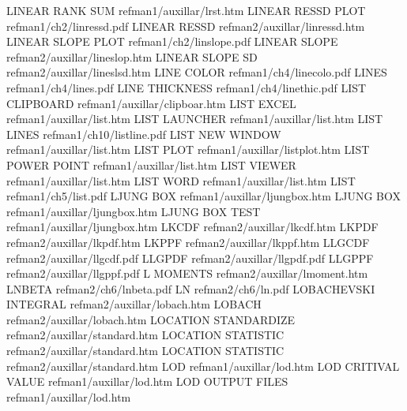 LINEAR RANK SUM                         refman1/auxillar/lrst.htm
LINEAR RESSD PLOT                       refman1/ch2/linressd.pdf
LINEAR RESSD                            refman2/auxillar/linressd.htm
LINEAR SLOPE PLOT                       refman1/ch2/linslope.pdf
LINEAR SLOPE                            refman2/auxillar/lineslop.htm
LINEAR SLOPE SD                         refman2/auxillar/lineslsd.htm
LINE COLOR                              refman1/ch4/linecolo.pdf
LINES                                   refman1/ch4/lines.pdf
LINE THICKNESS                          refman1/ch4/linethic.pdf
LIST CLIPBOARD                          refman1/auxillar/clipboar.htm
LIST EXCEL                              refman1/auxillar/list.htm
LIST LAUNCHER                           refman1/auxillar/list.htm
LIST LINES                              refman1/ch10/listline.pdf
LIST NEW WINDOW                         refman1/auxillar/list.htm
LIST PLOT                               refman1/auxillar/listplot.htm
LIST POWER POINT                        refman1/auxillar/list.htm
LIST VIEWER                             refman1/auxillar/list.htm
LIST WORD                               refman1/auxillar/list.htm
LIST                                    refman1/ch5/list.pdf
LJUNG BOX                               refman1/auxillar/ljungbox.htm
LJUNG BOX                               refman1/auxillar/ljungbox.htm
LJUNG BOX TEST                          refman1/auxillar/ljungbox.htm
LKCDF                                   refman2/auxillar/lkcdf.htm
LKPDF                                   refman2/auxillar/lkpdf.htm
LKPPF                                   refman2/auxillar/lkppf.htm
LLGCDF                                  refman2/auxillar/llgcdf.pdf
LLGPDF                                  refman2/auxillar/llgpdf.pdf
LLGPPF                                  refman2/auxillar/llgppf.pdf
L MOMENTS                               refman2/auxillar/lmoment.htm
LNBETA                                  refman2/ch6/lnbeta.pdf
LN                                      refman2/ch6/ln.pdf
LOBACHEVSKI INTEGRAL                    refman2/auxillar/lobach.htm
LOBACH                                  refman2/auxillar/lobach.htm
LOCATION STANDARDIZE                    refman2/auxillar/standard.htm
LOCATION STATISTIC                      refman2/auxillar/standard.htm
LOCATION STATISTIC                      refman2/auxillar/standard.htm
LOD                                     refman1/auxillar/lod.htm
LOD CRITIVAL VALUE                      refman1/auxillar/lod.htm
LOD OUTPUT FILES                        refman1/auxillar/lod.htm
